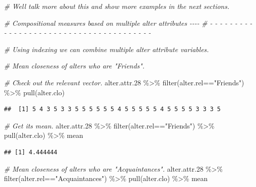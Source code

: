 \documentclass[
]{book}
\newenvironment{Shaded}{\begin{snugshade}}{\end{snugshade}}
\newcommand{\CommentTok}[1]{\textcolor[rgb]{0.56,0.35,0.01}{\textit{#1}}}
\newcommand{\FloatTok}[1]{\textcolor[rgb]{0.00,0.00,0.81}{#1}}
\newcommand{\FunctionTok}[1]{\textcolor[rgb]{0.00,0.00,0.00}{#1}}
\newcommand{\NormalTok}[1]{#1}
\newcommand{\SpecialCharTok}[1]{\textcolor[rgb]{0.00,0.00,0.00}{#1}}
\newcommand{\StringTok}[1]{\textcolor[rgb]{0.31,0.60,0.02}{#1}}
\begin{document}
\begin{Shaded}
\begin{Highlighting}[]
\CommentTok{\# We\textquotesingle{}ll talk more about this and show more examples in the next sections.}


\CommentTok{\# Compositional measures based on multiple alter attributes                 {-}{-}{-}{-}}
\CommentTok{\# {-} {-} {-} {-} {-} {-} {-} {-} {-} {-} {-} {-} {-} {-} {-} {-} {-} {-} {-} {-} {-} {-} {-} {-} {-} {-} {-} {-} {-} {-} {-} {-} {-} {-} {-} {-} {-} {-} {-} }

\CommentTok{\# Using indexing we can combine multiple alter attribute variables.}

\CommentTok{\# Mean closeness of alters who are "Friends".}

\CommentTok{\# Check out the relevant vector.}
\NormalTok{alter.attr}\FloatTok{.28} \SpecialCharTok{\%\textgreater{}\%}
  \FunctionTok{filter}\NormalTok{(alter.rel}\SpecialCharTok{==}\StringTok{"Friends"}\NormalTok{) }\SpecialCharTok{\%\textgreater{}\%}
  \FunctionTok{pull}\NormalTok{(alter.clo)}
\end{Highlighting}
\end{Shaded}

\begin{verbatim}
##  [1] 5 4 3 5 3 3 5 5 5 5 5 5 4 5 5 5 5 5 4 5 5 5 5 3 3 3 5
\end{verbatim}

\begin{Shaded}
\begin{Highlighting}[]
\CommentTok{\# Get its mean.}
\NormalTok{alter.attr}\FloatTok{.28} \SpecialCharTok{\%\textgreater{}\%}
  \FunctionTok{filter}\NormalTok{(alter.rel}\SpecialCharTok{==}\StringTok{"Friends"}\NormalTok{) }\SpecialCharTok{\%\textgreater{}\%}
  \FunctionTok{pull}\NormalTok{(alter.clo) }\SpecialCharTok{\%\textgreater{}\%} 
\NormalTok{  mean}
\end{Highlighting}
\end{Shaded}

\begin{verbatim}
## [1] 4.444444
\end{verbatim}

\begin{Shaded}
\begin{Highlighting}[]
\CommentTok{\# Mean closeness of alters who are "Acquaintances".}
\NormalTok{alter.attr}\FloatTok{.28} \SpecialCharTok{\%\textgreater{}\%}
  \FunctionTok{filter}\NormalTok{(alter.rel}\SpecialCharTok{==}\StringTok{"Acquaintances"}\NormalTok{) }\SpecialCharTok{\%\textgreater{}\%}
  \FunctionTok{pull}\NormalTok{(alter.clo) }\SpecialCharTok{\%\textgreater{}\%} 
\NormalTok{  mean}
\end{Highlighting}
\end{Shaded}
\end{document}
